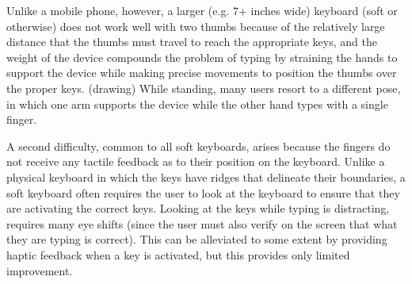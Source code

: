 Unlike a mobile phone, however, a larger (e.g. 7+ inches wide)
keyboard (soft or otherwise) does not work well with two thumbs
because of the relatively large distance that the thumbs must travel
to reach the appropriate keys, and the weight of the device compounds
the problem of typing by straining the hands to support the device
while making precise movements to position the thumbs over the proper
keys. (drawing) While standing, many users resort to a different pose,
in which one arm supports the device while the other hand types with a
single finger.

A second difficulty, common to all soft keyboards, arises because the
fingers do not receive any tactile feedback as to their position on
the keyboard.  Unlike a physical keyboard in which the keys have
ridges that delineate their boundaries, a soft keyboard often requires
the user to look at the keyboard to ensure that they are activating
the correct keys.  Looking at the keys while typing is distracting,
requires many eye shifts (since the user must also verify on the
screen that what they are typing is correct).  This can be alleviated
to some extent by providing haptic feedback when a key is activated,
but this provides only limited improvement.

